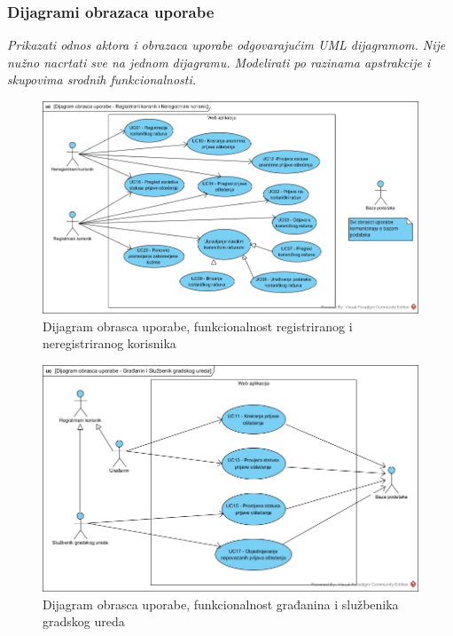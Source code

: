 \subsubsection{Dijagrami obrazaca uporabe}

\textit{Prikazati odnos aktora i obrazaca uporabe odgovarajućim UML dijagramom. Nije nužno nacrtati sve na jednom dijagramu. Modelirati po razinama apstrakcije i skupovima srodnih funkcionalnosti.}
\eject

\begin{figure}[H]
	\includegraphics[scale=0.5]{slike/UC-registrirani-neregistrirani} %
	\centering
	\caption{Dijagram obrasca uporabe, funkcionalnost registriranog i neregistriranog korisnika}
	\label{fig:DijagramObrascaUporabeRegistriranNeregistriranKorisnik}
\end{figure}

\begin{figure}[H]
	\includegraphics[scale=0.5]{slike/UC-gradanin-sluzbenik} %
	\centering
	\caption{Dijagram obrasca uporabe, funkcionalnost građanina i službenika gradskog ureda}
	\label{fig:DijagramObrascaUporabeGradaninSluzbenik}
\end{figure}


